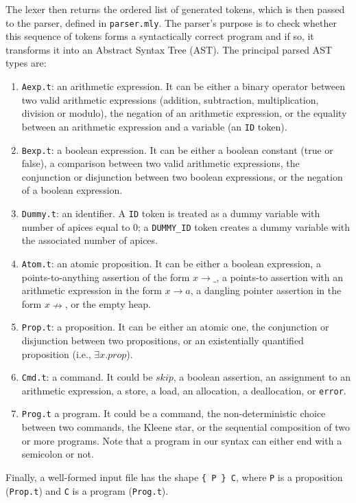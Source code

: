 \documentclass[parskip=half]{scrartcl}
\begin{document}
The lexer then returns the ordered list of generated tokens, which is then passed to the parser, defined in \texttt{parser.mly}.
The parser's purpose is to check whether this sequence of tokens forms a syntactically correct program and if so, it transforms it into an Abstract Syntax Tree (AST).
The principal parsed AST types are:

\begin{enumerate}
  \item \texttt{Aexp.t}: an arithmetic expression. It can be either a binary operator between two valid arithmetic expressions (addition, subtraction, multiplication, division or modulo), the negation of an arithmetic expression, or the equality between an arithmetic expression and a variable (an \texttt{ID} token).

  \item \texttt{Bexp.t}: a boolean expression. It can be either a boolean constant (true or false), a comparison between two valid arithmetic expressions, the conjunction or disjunction between two boolean expressions, or the negation of a boolean expression.

  \item \texttt{Dummy.t}: an identifier. A \texttt{ID} token is treated as a dummy variable with number of apices equal to 0; a \texttt{DUMMY\_ID} token creates a dummy variable with the associated number of apices.
  
  \item \texttt{Atom.t}: an atomic proposition. It can be either a boolean expression, a points-to-anything assertion of the form $x \rightarrow \_$, a points-to assertion with an arithmetic expression in the form $x \rightarrow a$, a dangling pointer assertion in the form $x \nrightarrow$, or the empty heap.
  
  \item \texttt{Prop.t}: a proposition. It can be either an atomic one, the conjunction or disjunction between two propositions, or an existentially quantified proposition (i.e., $\exists x. prop$).
  
  \item \texttt{Cmd.t}: a command. It could be $skip$, a boolean assertion, an assignment to an arithmetic expression, a store, a load, an allocation, a deallocation, or \texttt{error}.
  
  \item \texttt{Prog.t} a program. It could be a command, the non-deterministic choice between two commands, the Kleene star, or the sequential composition of two or more programs. Note that a program in our syntax can either end with a semicolon or not.
\end{enumerate}
Finally, a well-formed input file has the shape \verb|{ P } C|, where \texttt{P} is a proposition (\texttt{Prop.t}) and \texttt{C} is a program (\texttt{Prog.t}).
\end{document}
